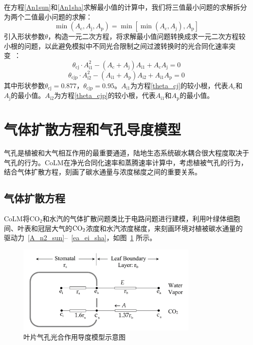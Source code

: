 在方程\eqref{An1sun}和\eqref{An1sha}求解最小值的计算中，我们将三值最小问题的求解拆分为两个二值最小问题的求解：
\begin{equation}\label{min_Ac_Aj_Ae}
\min \left(A_{\mathrm{c}}, A_{\mathrm{j}}, A_{\mathrm{p}}\right)
= \min \left[\min \left(A_{\mathrm{c}}, A_{\mathrm{j}}\right), A_{\mathrm{p}}\right]
\end{equation}
引入形状参数$\theta$，构造一元二次方程，将求解最小值问题转换成求一元二次方程较小根的问题，以此避免模拟中不同光合限制之间过渡转换时的光合同化速率突变~\citep{collatz1991,collatz1992}：
\begin{equation}\label{theta_cj}
\theta_{\mathrm{c j}} \cdot A_{\mathrm{i1}}^{2}-\left(A_{\mathrm{c}}+A_{\mathrm{j}}\right) A_{\mathrm{i1}}+A_{\mathrm{c}} A_{\mathrm{j}}=0
\end{equation}
\begin{equation}\label{theta_cjp}
\theta_{\mathrm{c j p}} \cdot A_{\mathrm{i2}}^{2}-\left(A_{\mathrm{i1}}+A_{\mathrm{p}}\right) A_{\mathrm{i2}}+A_{\mathrm{i1}} A_{\mathrm{p}}=0
\end{equation}
其中形状参数$\theta_{\mathrm{cj}}=0.877$，$\theta_{\mathrm{cjp}}=0.95$。$A_{\mathrm{i1}}$为方程\eqref{theta_cj}的较小根，代表$A_{\mathrm {c}}$和$A_{\mathrm {j}}$的最小值。$A_{\mathrm{i2}}$为方程\eqref{theta_cjp}的较小根，代表$A_{\mathrm{i1}}$和$A_{\mathrm {p}}$的最小值。


\section{气体扩散方程和气孔导度模型}\label{气体扩散方程和气孔导度模型}
气孔是植被和大气相互作用的最重要通道，陆地生态系统碳水耦合很大程度取决于气孔的行为。CoLM在净光合同化速率和蒸腾速率计算中，考虑植被气孔的行为，结合气体扩散方程，刻画了碳水通量与浓度梯度之间的重要关系。

\subsection{气体扩散方程}

CoLM将CO$_2$和水汽的气体扩散问题类比于电路问题进行建模，利用叶绿体细胞间、叶表和冠层大气的$\rm CO_2$浓度和水汽浓度梯度，来刻画环境对植被碳水通量的驱动力~\eqref{A_n2_sun}--~\eqref{ea_ei_sha}，如图~\ref{fig:叶片气孔光合作用导度模型示意图} 所示。
%
{
\begin{figure}[htbp]
\centering
\includegraphics[width=0.8\textwidth]{Figures/气孔导度和光合作用/叶片气孔光合作用导度模型示意图.png}
\caption{叶片气孔光合作用导度模型示意图}
\label{fig:叶片气孔光合作用导度模型示意图}
\end{figure}
}

